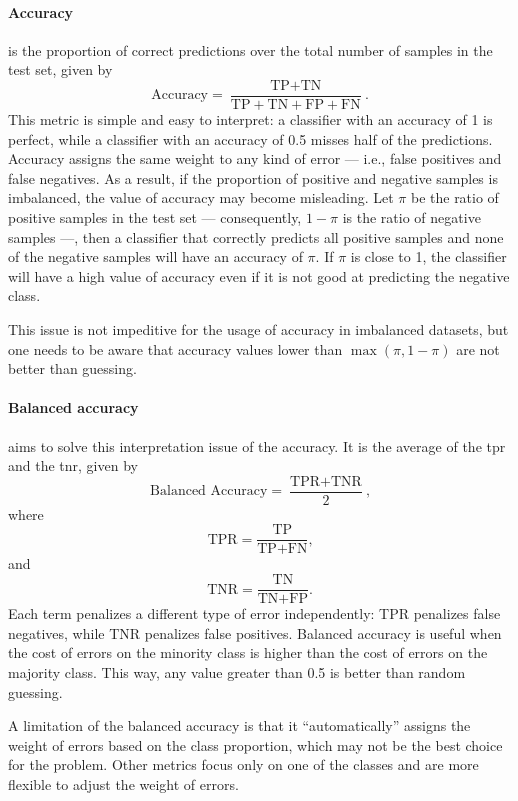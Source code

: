 \paragraph{Accuracy} is the proportion of correct predictions over the total number of
samples in the test set, given by
\begin{equation*}
  \text{Accuracy} = \frac{\text{TP} + \text{TN}}{\text{TP} + \text{TN} + \text{FP} + \text{FN}}\text{.}
\end{equation*}
This metric is simple and easy to interpret: a \gls{classifier} with an accuracy of 1 is
perfect, while a \gls{classifier} with an accuracy of 0.5 misses half of the predictions.
Accuracy assigns the same weight to any kind of error --- i.e., false positives and false
negatives.  As a result, if the proportion of positive and negative samples is imbalanced,
the value of accuracy may become misleading.  Let $\pi$ be the ratio of positive samples in
the test set --- consequently, $1-\pi$ is the ratio of negative samples ---, then a
\gls{classifier} that correctly predicts all positive samples and none of the negative samples
will have an accuracy of $\pi$.  If $\pi$ is close to 1, the \gls{classifier} will have a high value
of accuracy even if it is not good at predicting the negative class.

This issue is not impeditive for the usage of accuracy in imbalanced datasets, but one
needs to be aware that accuracy values lower than $\max(\pi, 1-\pi)$ are not better than
guessing.

\paragraph{Balanced accuracy} aims to solve this interpretation issue of the accuracy.  It
is the average of the \gls{tpr} and the \gls{tnr}, given by
\begin{equation*}
  \text{Balanced Accuracy} = \frac{\text{TPR} + \text{TNR}}{2}\text{,}
\end{equation*}
where
\[
  \text{TPR} = \frac{\text{TP}}{\text{TP} + \text{FN}}\text{,}
\]
and
\[
  \text{TNR} = \frac{\text{TN}}{\text{TN} + \text{FP}}\text{.}
\]
Each term penalizes a different type of error independently: TPR penalizes false
negatives, while TNR penalizes false positives.  Balanced accuracy is useful when the cost
of errors on the minority class is higher than the cost of errors on the majority class.
This way, any value greater than 0.5 is better than random guessing.

A limitation of the balanced accuracy is that it ``automatically'' assigns the weight of
errors based on the class proportion, which may not be the best choice for the problem.
Other metrics focus only on one of the classes and are more flexible to adjust the weight of
errors.

